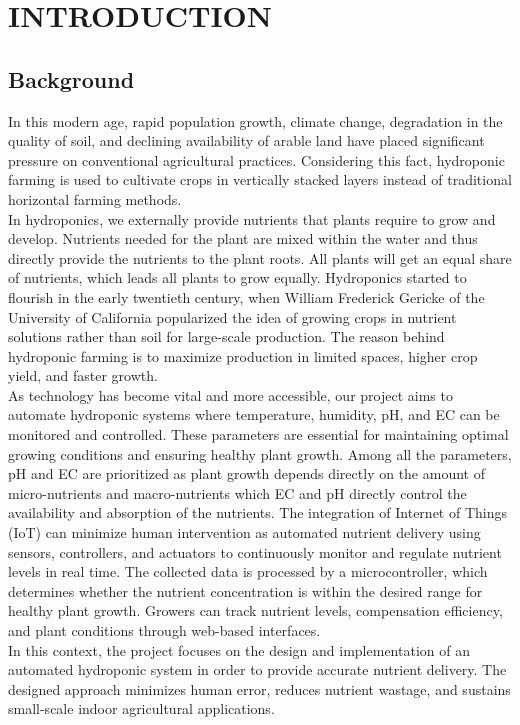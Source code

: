 \chapter{INTRODUCTION}

\section{Background}
In this modern age,  rapid population growth, climate change, degradation in the quality of soil, and declining availability of arable land have placed significant pressure on conventional agricultural practices. Considering this fact, hydroponic farming is used to cultivate crops in vertically stacked layers instead of traditional horizontal farming methods.\\[10pt]
In hydroponics, we externally provide nutrients that plants require to grow and develop. Nutrients needed for the plant are mixed within the water and thus directly provide the nutrients to the plant roots. All plants will get an equal share of nutrients, which leads all plants to grow equally.
Hydroponics started to flourish in the early twentieth century, when William Frederick Gericke of the University of California popularized the idea of growing crops in nutrient solutions rather than soil for large-scale production. The reason behind hydroponic farming is to maximize production in limited spaces, higher crop yield, and faster growth.\\[10pt]
As technology has become vital and more accessible, our project aims to automate hydroponic systems where temperature, humidity, pH, and EC can be monitored and controlled. These parameters are essential for maintaining optimal growing conditions and ensuring healthy plant growth. Among all the parameters, pH and EC are prioritized as plant growth depends directly on the amount of micro-nutrients and macro-nutrients which EC and pH directly control the availability and absorption of the nutrients. The integration of Internet of Things (IoT) can minimize human intervention as automated nutrient delivery using sensors, controllers, and actuators to continuously monitor and regulate nutrient levels in real time. The collected data is processed by a microcontroller, which determines whether the nutrient concentration is within the desired range for healthy plant growth. Growers can track nutrient levels, compensation efficiency, and plant conditions through web-based interfaces.\\[10pt]
In this context, the project focuses on the design and implementation of an automated hydroponic system in order to provide accurate nutrient delivery. The designed approach minimizes human error, reduces nutrient wastage, and sustains small-scale indoor agricultural applications.


